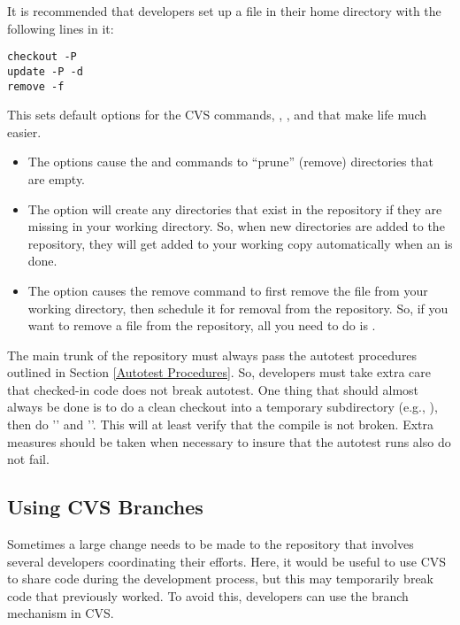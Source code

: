 It is recommended that developers set up a  file in their
home directory with the following lines in it:
\begin{verbatim}
checkout -P
update -P -d
remove -f
\end{verbatim}
This sets default options for the CVS commands, ,
, and  that make life much easier.
\begin{itemize}
\item The  options cause the  and 
commands to ``prune'' (remove) directories that are empty.

\item The  option will create any directories that exist in the
repository if they are missing in your working directory.  So, when
new directories are added to the repository, they will get added to
your working copy automatically when an  is done.

\item The  option causes the remove command to first remove the
file from your working directory, then schedule it for removal from
the repository.  So, if you want to remove a file from the repository,
all you need to do is .
\end{itemize}

The main trunk of the repository must always pass the autotest
procedures outlined in Section \ref{Autotest Procedures}.  So,
developers must take extra care that checked-in code does not break
autotest.  One thing that should almost always be done is to do a
clean checkout into a temporary subdirectory (e.g., ),
then do '' and ''.  This will at least
verify that the compile is not broken.  Extra measures should be
taken when necessary to insure that the autotest runs also do not
fail.

\subsection{Using CVS Branches}
\label{Using CVS Branches}

Sometimes a large change needs to be made to the repository that
involves several developers coordinating their efforts.  Here, it
would be useful to use CVS to share code during the development
process, but this may temporarily break code that previously worked.
To avoid this, developers can use the branch mechanism in CVS.

